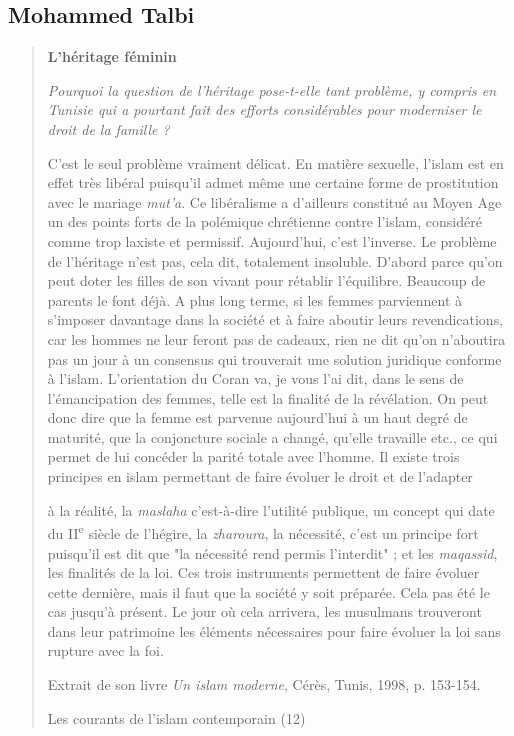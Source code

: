 \hypertarget{mohammed-talbi}{%
\subsection{\texorpdfstring{{Mohammed
Talbi}}{Mohammed Talbi}}\label{mohammed-talbi}}

\begin{quote}
\textbf{L'héritage féminin}

\emph{Pourquoi la question de l'héritage pose-t-elle tant problème, y
compris en Tunisie qui a pourtant fait des efforts considérables pour
moderniser le droit de la famille ?}

C'est le seul problème vraiment délicat. En matière sexuelle, l'islam
est en effet très libéral puisqu'il admet même une certaine forme de
prostitution avec le mariage \emph{mut'a}. Ce libéralisme a d'ailleurs
constitué au Moyen Age un des points forts de la polémique chrétienne
contre l'islam, considéré comme trop laxiste et permissif. Aujourd'hui,
c'est l'inverse. Le problème de l'héritage n'est pas, cela dit,
totalement insoluble. D'abord parce qu'on peut doter les filles de son
vivant pour rétablir l'équilibre. Beaucoup de parents le font déjà. A
plus long terme, si les femmes parviennent à s'imposer davantage dans la
société et à faire aboutir leurs revendications, car les hommes ne leur
feront pas de cadeaux, rien ne dit qu'on n'aboutira pas un jour à un
consensus qui trouverait une solution juridique conforme à l'islam.
L'orientation du Coran va, je vous l'ai dit, dans le sens de
l'émancipation des femmes, telle est la finalité de la révélation. On
peut donc dire que la femme est parvenue aujourd'hui à un haut degré de
maturité, que la conjoncture sociale a changé, qu'elle travaille etc.,
ce qui permet de lui concéder la parité totale avec l'homme. Il existe
trois principes en islam permettant de faire évoluer le droit et de
l'adapter

à la réalité, la \emph{maslaha} c'est-à-dire l'utilité publique, un
concept qui date du II\textsuperscript{e} siècle de l'hégire, la
\emph{zharoura}, la nécessité, c'est un principe fort puisqu'il est dit
que "la nécessité rend permis l'interdit" ; et les \emph{maqassid}, les
finalités de la loi. Ces trois instruments permettent de faire évoluer
cette dernière, mais il faut que la société y soit préparée. Cela pas
été le cas jusqu'à présent. Le jour où cela arrivera, les musulmans
trouveront dans leur patrimoine les éléments nécessaires pour faire
évoluer la loi sans rupture avec la foi.

Extrait de son livre \emph{Un islam moderne}, Cérès, Tunis, 1998, p.
153-154.

Les courants de l'islam contemporain (12)
\end{quote}


